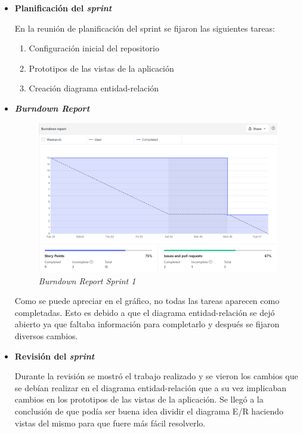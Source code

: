 \begin{itemize}
\item\textbf{Planificación del \textit{sprint}}

En la reunión de planificación del sprint se fijaron las siguientes tareas:
\begin{enumerate}
	\item Configuración inicial del repositorio
	\item Prototipos de las vistas de la aplicación
	\item Creación diagrama entidad-relación
\end{enumerate}

\item\textbf{\textit{Burndown Report}}

\begin{figure}[h]
	\centering
	\includegraphics[width=\textwidth]{../img/Anexos/Sprints/Sprint1.png}
	\caption{\textit{Burndown Report Sprint 1}}
\end{figure}
\FloatBarrier
Como se puede apreciar en el gráfico, no todas las tareas aparecen como completadas. Esto es debido a que el diagrama entidad-relación se dejó abierto ya que faltaba información para completarlo y después se fijaron diversos cambios.

\item\textbf{Revisión del \textit{sprint}}

Durante la revisión se mostró el trabajo realizado y se vieron los cambios que se debían realizar en el diagrama entidad-relación que a su vez implicaban cambios en los prototipos de las vistas de la aplicación.
Se llegó a la conclusión de que podía ser buena idea dividir el diagrama E/R haciendo vistas del mismo para que fuere más fácil resolverlo.
\end{itemize}


